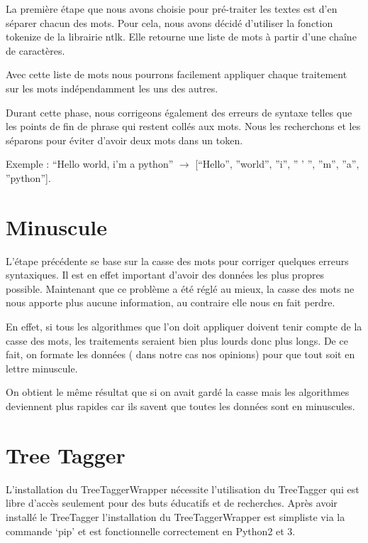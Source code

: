 \documentclass[a4paper]{report}
\begin{document}
            La première étape que nous avons choisie pour pré-traiter les textes est d'en séparer chacun des mots.
            Pour cela, nous avons décidé d'utiliser la fonction tokenize de la librairie ntlk. Elle retourne une liste de mots à partir d'une chaîne de caractères.

            Avec cette liste de mots nous pourrons facilement appliquer chaque traitement sur les mots indépendamment les uns des autres.

            Durant cette phase, nous corrigeons également des erreurs de syntaxe telles que les points de fin de phrase qui restent collés aux mots. Nous les recherchons et les séparons pour éviter d'avoir deux mots dans un token.

            Exemple :
            “Hello world, i’m a python” $\rightarrow$ [“Hello”, ”world”, ”i”, ” ’ ”, ”m”, ”a”, ”python”].

        \section{Minuscule}

            L’étape précédente se base sur la casse des mots pour corriger quelques erreurs syntaxiques. Il est en effet important d’avoir des données les plus propres possible. Maintenant que ce problème a été réglé au mieux, la casse des mots ne nous apporte plus aucune information, au contraire elle nous en fait perdre.

            En effet, si tous les algorithmes que l’on doit appliquer doivent tenir compte de la casse des mots, les traitements seraient bien plus lourds donc plus longs. De ce fait, on formate les données ( dans notre cas nos opinions) pour que tout soit en lettre minuscule.

            On obtient le même résultat que si on avait gardé la casse mais les algorithmes deviennent plus rapides car ils savent que toutes les données sont en minuscules.

        \section{Tree Tagger}

            L’installation du TreeTaggerWrapper nécessite l’utilisation du TreeTagger qui est libre d’accès seulement pour des buts éducatifs et de recherches. Après avoir installé le TreeTagger l’installation du TreeTaggerWrapper est simpliste via la commande ‘pip’ et est fonctionnelle correctement en Python2 et 3.
\end{document}
